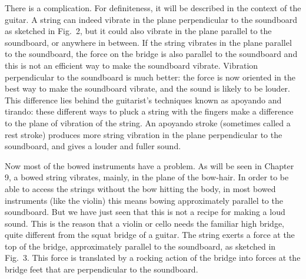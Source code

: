 
  There is a complication. For definiteness, it will be described in the 
  context of the guitar. A string can indeed vibrate in the plane perpendicular 
  to the soundboard as sketched in Fig.\ 2, but it could also vibrate in the 
  plane parallel to the soundboard, or anywhere in between. If the string 
  vibrates in the plane parallel to the soundboard, the force on the bridge is 
  also parallel to the soundboard and this is not an efficient way to make the 
  soundboard vibrate. Vibration perpendicular to the soundboard is much better: 
  the force is now oriented in the best way to make the soundboard vibrate, and 
  the sound is likely to be louder. This difference lies behind the guitarist's 
  techniques known as apoyando and tirando: these different ways to pluck a 
  string with the fingers make a difference to the plane of vibration of the 
  string. An apoyando stroke (sometimes called a rest stroke) produces more 
  string vibration in the plane perpendicular to the soundboard, and gives a 
  louder and fuller sound. 

  Now most of the bowed instruments have a problem. As will be seen in Chapter 
  9, a bowed string vibrates, mainly, in the plane of the bow-hair. In order to 
  be able to access the strings without the bow hitting the body, in most bowed 
  instruments (like the violin) this means bowing approximately parallel to the 
  soundboard. But we have just seen that this is not a recipe for making a loud 
  sound. This is the reason that a violin or cello needs the familiar high 
  bridge, quite different from the squat bridge of a guitar. The string exerts 
  a force at the top of the bridge, approximately parallel to the soundboard, 
  as sketched in Fig.\ 3. This force is translated by a rocking action of the 
  bridge into forces at the bridge feet that are perpendicular to the 
  soundboard. 



